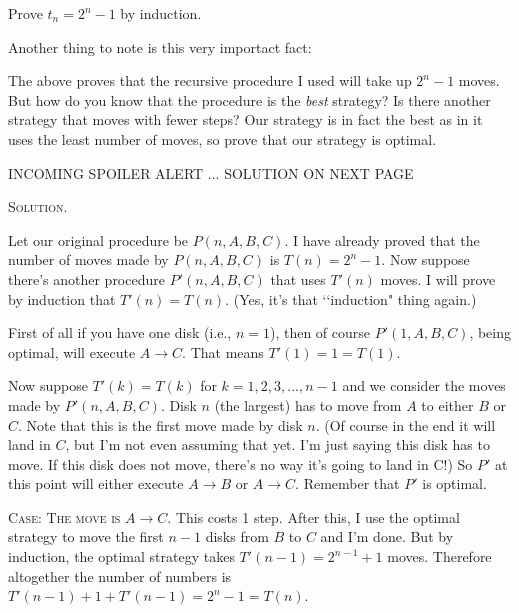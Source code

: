 \newpage
\begin{ex}
  Prove $t_n = 2^n - 1$ by induction.
\end{ex}


\newpage
Another thing to note is this very importact fact:


\newpage
\begin{ex}
  The above proves that the recursive procedure I used
  will take up $2^n - 1$ moves.
  But how do you know that the procedure is the \textit{best}
  strategy?
  Is there another strategy that moves with fewer steps?
  Our strategy is in fact the best as in it uses the least
  number of moves, so prove that our strategy is optimal.
\end{ex}

INCOMING SPOILER ALERT ... SOLUTION ON NEXT PAGE

\newpage
\textsc{Solution.}

Let our original procedure be $P(n, A, B, C)$. I have already proved
that the number of moves made by $P(n, A, B, C)$ is $T(n) = 2^n - 1$.
Now suppose there's another procedure $P'(n, A, B, C)$ that uses
$T'(n)$ moves. I will prove by induction that $T'(n) = T(n)$.
(Yes, it's that \lq\lq induction" thing again.)

First of all if you have one disk (i.e., $n = 1$), then of course
$P'(1, A, B, C)$, being optimal, will execute $A \rightarrow C$.
That means $T'(1) = 1 = T(1)$.

Now suppose $T'(k) = T(k)$ for $k = 1, 2, 3, ..., n - 1$
and we consider the moves made by $P'(n, A, B, C)$.
Disk $n$ (the largest) has to move from $A$ to either $B$ or $C$.
Note that this is the first move made by disk $n$.
(Of course in the end it will land in $C$, but I'm not even assuming that yet.
I'm just saying this disk has to move.
If this disk does not move, there's no way it's going to land in C!)
So $P'$ at this point will either execute $A \rightarrow B$
or $A \rightarrow C$.
Remember that $P'$ is optimal.

\textsc{Case: The move is $A\rightarrow C$.}
This costs 1 step.
After this, I use the optimal strategy to move the first $n - 1$ disks
from $B$ to $C$ and I'm done.
But by induction, the optimal strategy takes
$T'(n-1) = 2^{n - 1} + 1$ moves.
Therefore altogether the number of numbers is
$T'(n - 1) + 1 + T'(n-1) = 2^n - 1 = T(n)$.

